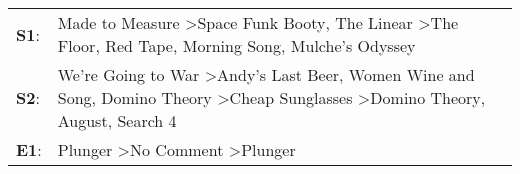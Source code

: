 \begin{supertabular}{p{0.03\textwidth}p{0.92\textwidth}}
 \textbf{S1}:  &                                                                  Made to Measure\textsuperscript{} \textgreater \enspace Space Funk Booty\textsuperscript{}, \enspace The Linear\textsuperscript{} \textgreater \enspace The Floor\textsuperscript{}, \enspace Red Tape\textsuperscript{}, \enspace Morning Song\textsuperscript{}, \enspace Mulche's Odyssey\textsuperscript{}  \enspace  \\
 \textbf{S2}:  &  We're Going to War\textsuperscript{} \textgreater \enspace Andy's Last Beer\textsuperscript{}, \enspace Women Wine and Song\textsuperscript{}, \enspace Domino Theory\textsuperscript{} \textgreater \enspace Cheap Sunglasses\textsuperscript{} \textgreater \enspace Domino Theory\textsuperscript{}, \enspace August\textsuperscript{}, \enspace Search 4\textsuperscript{}  \enspace  \\
 \textbf{E1}:  &                                                                                                                                                                                                                                                    Plunger\textsuperscript{} \textgreater \enspace No Comment\textsuperscript{} \textgreater \enspace Plunger\textsuperscript{}  \enspace  \\
\end{supertabular}
